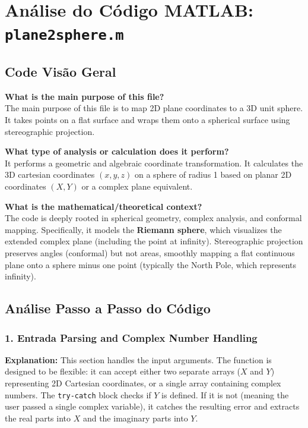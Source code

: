 
\chapter{Análise do Código MATLAB: \texttt{plane2sphere.m}}
\section{Code Visão Geral}

\textbf{What is the main purpose of this file?} \\
The main purpose of this file is to map 2D plane coordinates to a 3D unit sphere. It takes points on a flat surface and wraps them onto a spherical surface using stereographic projection. 

\textbf{What type of analysis or calculation does it perform?} \\
It performs a geometric and algebraic coordinate transformation. It calculates the 3D cartesian coordinates $(x,y,z)$ on a sphere of radius 1 based on planar 2D coordinates $(X,Y)$ or a complex plane equivalent.

\textbf{What is the mathematical/theoretical context?} \\
The code is deeply rooted in spherical geometry, complex analysis, and conformal mapping. Specifically, it models the \textbf{Riemann sphere}, which visualizes the extended complex plane (including the point at infinity). Stereographic projection preserves angles (conformal) but not areas, smoothly mapping a flat continuous plane onto a sphere minus one point (typically the North Pole, which represents infinity).

\section{Análise Passo a Passo do Código}

\subsection{1. Entrada Parsing and Complex Number Handling}
\textbf{Explanation:} 
This section handles the input arguments. The function is designed to be flexible: it can accept either two separate arrays ($X$ and $Y$) representing 2D Cartesian coordinates, or a single array containing complex numbers. The \texttt{try-catch} block checks if $Y$ is defined. If it is not (meaning the user passed a single complex variable), it catches the resulting error and extracts the real parts into $X$ and the imaginary parts into $Y$.

